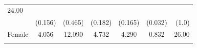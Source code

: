 \documentclass[11pt,a4paper,openany]{book}
\begin{document}
\begin{longtable}[]{@{}lcccccr@{}}
\begin{minipage}[t]{0.04\columnwidth}
24.00\strut
\end{minipage}\tabularnewline
\begin{minipage}[t]{0.05\columnwidth}\raggedright\strut
\strut
\end{minipage} & \begin{minipage}[t]{0.42\columnwidth}\centering\strut
(0.156)\strut
\end{minipage} & \begin{minipage}[t]{0.06\columnwidth}\centering\strut
(0.465)\strut
\end{minipage} & \begin{minipage}[t]{0.09\columnwidth}\centering\strut
(0.182)\strut
\end{minipage} & \begin{minipage}[t]{0.06\columnwidth}\centering\strut
(0.165)\strut
\end{minipage} & \begin{minipage}[t]{0.06\columnwidth}\centering\strut
(0.032)\strut
\end{minipage} & \begin{minipage}[t]{0.04\columnwidth}\raggedleft\strut
(1.0)\strut
\end{minipage}\tabularnewline
\begin{minipage}[t]{0.05\columnwidth}\raggedright\strut
Female\strut
\end{minipage} & \begin{minipage}[t]{0.42\columnwidth}\centering\strut
4.056\strut
\end{minipage} & \begin{minipage}[t]{0.06\columnwidth}\centering\strut
12.090\strut
\end{minipage} & \begin{minipage}[t]{0.09\columnwidth}\centering\strut
4.732\strut
\end{minipage} & \begin{minipage}[t]{0.06\columnwidth}\centering\strut
4.290\strut
\end{minipage} & \begin{minipage}[t]{0.06\columnwidth}\centering\strut
0.832\strut
\end{minipage} & \begin{minipage}[t]{0.04\columnwidth}\raggedleft\strut
26.00\strut
\end{minipage}\tabularnewline
\begin{minipage}[t]{0.05\columnwidth}\raggedright\strut
\strut
\end{minipage} & \begin{minipage}[t]{0.42\columnwidth}\centering\strut

\end{minipage}
\end{longtable}
\end{document}
